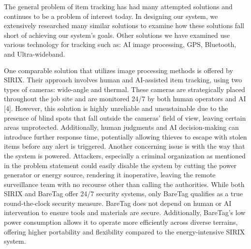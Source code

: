 \documentclass[conference]{IEEEtran}
\begin{document}
The general problem of item tracking has had many attempted solutions 
and continues to be a problem of interest today. In designing our system, 
we extensively researched many similar solutions to examine how these 
solutions fall short of achieving our system’s goals. Other solutions 
we have examined use various technology for tracking such as: AI image 
processing, GPS, Bluetooth, and Ultra-wideband.

One comparable solution that utilizes image processing methods is offered 
by SIRIX. Their approach involves human and AI-assisted item tracking, 
using two types of cameras: wide-angle and thermal. These cameras are 
strategically placed throughout the job site and are monitored 24/7 by both
human operators and AI [4]. However, this solution is highly unreliable 
and unsustainable due to the presence of blind spots that fall outside 
the cameras' field of view, leaving certain areas unprotected. 
Additionally, human judgments and AI decision-making can introduce 
further response time, potentially allowing thieves to escape with 
stolen items before any alert is triggered. Another concerning issue 
is with the way that the system is powered. Attackers, especially a 
criminal organization as mentioned in the problem statement could easily 
disable the system by cutting the power generator or energy source, 
rendering it inoperative, leaving the remote surveillance team with no 
recourse other than calling the authorities. While both SIRIX and 
BareTag offer 24/7 security systems, only BareTag qualifies as a 
true round-the-clock security measure. BareTag does not depend on 
human or AI intervention to ensure tools and materials are secure. 
Additionally, BareTag's low power consumption allows it to operate 
more efficiently across diverse terrains, offering higher portability 
and flexibility compared to the energy-intensive SIRIX system.
\end{document}
